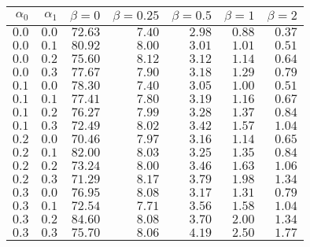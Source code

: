 \begin{tabular}{rr|rrrrr}
\hline\hline
 $\alpha_0$ & $\alpha_1$ & $\beta=0$ & $\beta=0.25$ & $\beta=0.5$ & $\beta=1$ & $\beta=2$ \\ 
 \hline
$0.0$ & $0.0$ & $72.63$ & $7.40$ & $2.98$ & $0.88$ & $0.37$\\ 
$0.0$ & $0.1$ & $80.92$ & $8.00$ & $3.01$ & $1.01$ & $0.51$\\ 
$0.0$ & $0.2$ & $75.60$ & $8.12$ & $3.12$ & $1.14$ & $0.64$\\ 
$0.0$ & $0.3$ & $77.67$ & $7.90$ & $3.18$ & $1.29$ & $0.79$\\ 
$0.1$ & $0.0$ & $78.30$ & $7.40$ & $3.05$ & $1.00$ & $0.51$\\ 
$0.1$ & $0.1$ & $77.41$ & $7.80$ & $3.19$ & $1.16$ & $0.67$\\ 
$0.1$ & $0.2$ & $76.27$ & $7.99$ & $3.28$ & $1.37$ & $0.84$\\ 
$0.1$ & $0.3$ & $72.49$ & $8.02$ & $3.42$ & $1.57$ & $1.04$\\ 
$0.2$ & $0.0$ & $70.46$ & $7.97$ & $3.16$ & $1.14$ & $0.65$\\ 
$0.2$ & $0.1$ & $82.00$ & $8.03$ & $3.25$ & $1.35$ & $0.84$\\ 
$0.2$ & $0.2$ & $73.24$ & $8.00$ & $3.46$ & $1.63$ & $1.06$\\ 
$0.2$ & $0.3$ & $71.29$ & $8.17$ & $3.79$ & $1.98$ & $1.34$\\ 
$0.3$ & $0.0$ & $76.95$ & $8.08$ & $3.17$ & $1.31$ & $0.79$\\ 
$0.3$ & $0.1$ & $72.54$ & $7.71$ & $3.56$ & $1.58$ & $1.04$\\ 
$0.3$ & $0.2$ & $84.60$ & $8.08$ & $3.70$ & $2.00$ & $1.34$\\ 
$0.3$ & $0.3$ & $75.70$ & $8.06$ & $4.19$ & $2.50$ & $1.77$\\ 
 \hline 
 \end{tabular}